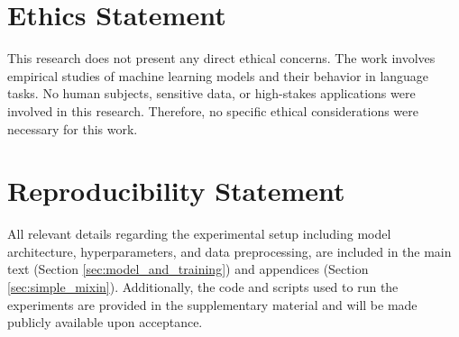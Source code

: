 \section*{Ethics Statement}
This research does not present any direct ethical concerns. The work involves empirical studies of machine learning models and their behavior in language tasks. No human subjects, sensitive data, or high-stakes applications were involved in this research. Therefore, no specific ethical considerations were necessary for this work.
\section*{Reproducibility Statement}
All relevant details regarding the experimental setup including model architecture, hyperparameters, and data preprocessing, are included in the main text (Section \ref{sec:model_and_training}) and appendices (Section \ref{sec:simple_mixin}).  Additionally, the code and scripts used to run the experiments are provided in the supplementary material and will be made publicly available upon acceptance.